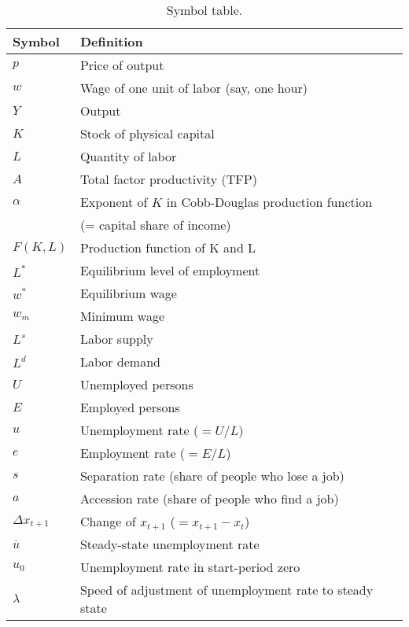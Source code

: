 \begin{table}[htb]
\centering
\caption{Symbol table.}
\begin{tabular*}{0.95\textwidth}{l@{\extracolsep{\fill}}l}
\toprule
Symbol & Definition\\
\midrule
$p$                 &Price of output\\
$w$                    &Wage of one unit of labor (say, one hour)\\
$Y$                 & Output\\
$K$                 & Stock of physical capital\\
$L$                 &    Quantity of labor\\
$A$                            &Total factor productivity (TFP)\\
$\alpha$                     &Exponent of $K$ in Cobb-Douglas production function \\
                            &(= capital share of income)\\
$F(K,L)$                    &Production function of K and L\\
$L^*$               &Equilibrium level of employment\\
$w^*$                &Equilibrium wage\\
$w_m$                &Minimum wage\\
$L^s$                 &Labor supply\\
$L^d$                 &Labor demand\\
$U$                 &Unemployed persons\\
$E$                 &Employed persons\\
$u$                 &Unemployment rate ($=U/L$)\\
$e$                 &Employment rate ($=E/L$)\\
$s$                 &Separation rate (share of people who lose a job)\\
$a$                 &Accession rate (share of people who find a job)\\
$\Delta x_{t+1}$    &Change of $x_{t+1}$ ($=x_{t+1}-x_t$)\\
$\overline{u}$          &Steady-state unemployment rate \\
$u_0$                 &Unemployment rate in start-period zero\\
$\lambda$              &Speed of adjustment of unemployment rate to steady state\\
\bottomrule
\end{tabular*}
\end{table}

